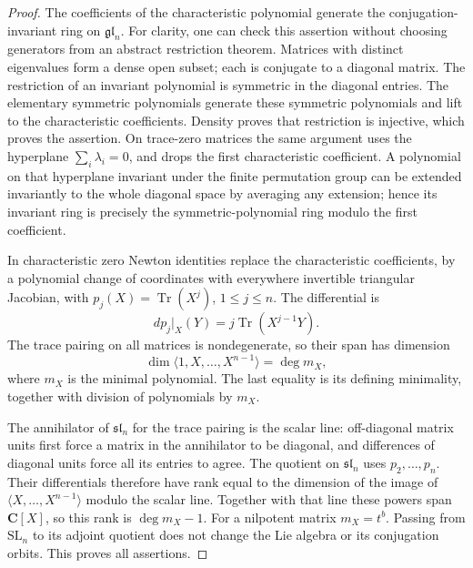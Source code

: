 \documentclass[11pt,a4paper]{article}
\theoremstyle{definition}\newtheorem{definition}[theorem]{Definition}
\theoremstyle{remark}\newtheorem{remark}[theorem]{Remark}
\begin{document}
\begin{proof}
The coefficients of the characteristic polynomial generate
the conjugation-invariant ring on \(\mathfrak{gl}_n\).
For clarity, one can check this assertion without choosing
generators from an abstract restriction theorem. Matrices
with distinct eigenvalues form a dense open subset; each is
conjugate to a diagonal matrix. The restriction of an
invariant polynomial is symmetric in the diagonal entries.
The elementary symmetric polynomials generate these symmetric
polynomials and lift to the characteristic coefficients.
Density proves that restriction is injective, which proves
the assertion. On trace-zero matrices the same argument uses
the hyperplane \(\sum_i\lambda_i=0\), and drops the first
characteristic coefficient. A polynomial on that hyperplane
invariant under the finite permutation group can be extended
invariantly to the whole diagonal space by averaging any
extension; hence its invariant ring is precisely the
symmetric-polynomial ring modulo the first coefficient.

In characteristic zero Newton identities replace the
characteristic coefficients, by a polynomial change of
coordinates with everywhere invertible triangular Jacobian,
with \(p_j(X)=\operatorname{Tr}(X^j)\), \(1\leq j\leq n\).
The differential is
\[
 dp_j|_X(Y)=j\operatorname{Tr}(X^{j-1}Y).
\]
The trace pairing on all matrices is nondegenerate, so their
span has dimension
\[
 \dim\langle 1,X,\ldots,X^{n-1}\rangle=\deg m_X,
\]
where \(m_X\) is the minimal polynomial. The last equality
is its defining minimality, together with division of
polynomials by \(m_X\).

The annihilator of \(\mathfrak{sl}_n\) for the trace pairing
is the scalar line: off-diagonal matrix units first force
a matrix in the annihilator to be diagonal, and differences
of diagonal units force all its entries to agree. The
quotient on \(\mathfrak{sl}_n\) uses \(p_2,\ldots,p_n\).
Their differentials therefore have rank equal to the
dimension of the image of \(\langle X,\ldots,X^{n-1}\rangle\)
modulo the scalar line. Together with that line these
powers span \(\mathbf C[X]\), so this rank is
\(\deg m_X-1\). For a nilpotent matrix \(m_X=t^b\).
Passing from \(\mathrm{SL}_n\) to its adjoint quotient
does not change the Lie algebra or its conjugation orbits.
This proves all assertions.
\end{proof}
\end{document}
